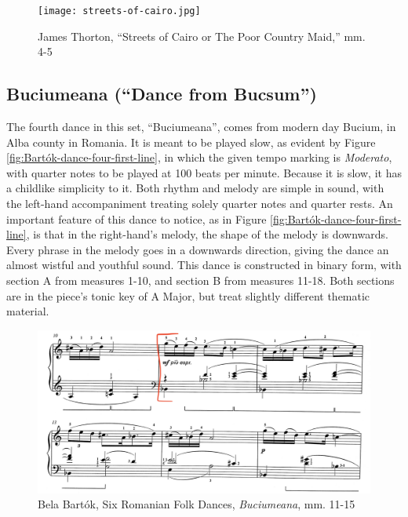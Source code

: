 \begin{figure}
  \centering
  \texttt{[image: streets-of-cairo.jpg]}
  \caption{James Thorton, ``Streets of Cairo or The Poor Country Maid,'' mm. 4-5}
  \label{fig:thorton-streets-of-cairo}
\end{figure}



\subsection{Buciumeana (``Dance from Bucsum'')}

The fourth dance in this set, ``Buciumeana'', comes from modern day Bucium, in Alba county in Romania. It is meant to be played slow, as evident by Figure \ref{fig:Bartók-dance-four-first-line}\autocite{Lung_2016}, in which the given tempo marking is \textit{Moderato}, with quarter notes to be played at 100 beats per minute. Because it is slow, it has a childlike simplicity to it. Both rhythm and melody are simple in sound, with the left-hand accompaniment treating solely quarter notes and quarter rests. An important feature of this dance to notice, as in Figure \ref{fig:Bartók-dance-four-first-line}\autocite{Lung_2016}, is that in the right-hand's melody, the shape of the melody is downwards. Every phrase in the melody goes in a downwards direction, giving the dance an almost wistful and youthful sound. This dance is constructed in binary form, with section A from measures 1-10, and section B from measures 11-18. Both sections are in the piece's tonic key of A Major, but treat slightly different thematic material. 

\begin{figure}
  \centering
  \includegraphics[width=\textwidth]{figures/bartok-dance-four-b-section-two-lines.jpg}
  \caption{Bela Bartók, Six Romanian Folk Dances, \textit{Buciumeana}, mm. 11-15}
  \label{fig:Bartók-dance-four-b-section-two-lines}
\end{figure}

